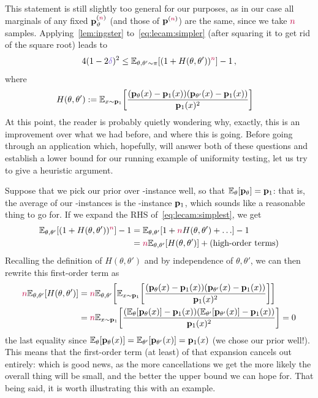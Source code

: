 This statement is still slightly too general for our purposes, as in our case all marginals of any fixed $\mathbf{p}_\vartheta^{({\textcolor{purple}{n}})}$ (and those of $\mathbf{p}^{({\textcolor{purple}{n}})}$) are the same, since we take ${\textcolor{purple}{n}}$ \iid samples. Applying~\cref{lem:ingster} to~\cref{eq:lecam:simpler} (after squaring it to get rid of the square root) leads to
\begin{equation}
	\label{eq:lecam:simplest}
	4(1-2\errprob)^2 \leq \bE{\theta,\theta'\sim\pi}{(1+{H(\theta,\theta')})^\ns} - 1\,,
\end{equation}
where 
\begin{align}
	\label{eq:lecam:simplest:chi:ip}
H(\theta,\theta') &\eqdef \bE{x\sim\p_\accept}{\frac{(\p_{\theta}(x)-\p_\accept(x))(\p_{\theta'}(x)-\p_\accept(x))}{\p_\accept(x)^2}}
\end{align}
At this point, the reader is probably quietly wondering why, exactly, this is an improvement over what we had before, and where this is going. Before going through an application which, hopefully, will answer both of these questions and establish a lower bound for our running example of uniformity testing, let us try to give a heuristic argument.

Suppose that we pick our prior over \no-instance well, so that $\bE{\theta}{\p_{\theta}}=\p_1$: that is, the average of our \no-instances is the \yes-instance $\mathbf{p}_1$, which sounds like a reasonable thing to go for. If we expand the RHS of~\cref{eq:lecam:simplest}, we get
\begin{align*}
\bE{\theta,\theta'}{(1+{H(\theta,\theta')})^\ns} - 1 
&=\bE{\theta,\theta'}{1+\ns H(\theta,\theta') + \dots } - 1 \\
&= \ns \bE{\theta,\theta'}{H(\theta,\theta')} + \textrm{(high-order terms)}
\end{align*}
Recalling the definition of $H(\theta,\theta')$ and by independence of $\theta,\theta'$, we can then rewrite this first-order term as
\begin{align*}
\ns \bE{\theta,\theta'}{H(\theta,\theta')}
&= \ns \bE{\theta,\theta'}{\bE{x\sim\p_\accept}{\frac{(\p_{\theta}(x)-\p_\accept(x))(\p_{\theta'}(x)-\p_\accept(x))}{\p_\accept(x)^2}}}\\
&=\ns \bE{x\sim\p_\accept}{\frac{(\bE{\theta}{\p_{\theta}(x)}-\p_\accept(x))(\bE{\theta'}{\p_{\theta'}(x)}-\p_\accept(x))}{\p_\accept(x)^2}}
= 0
\end{align*}
the last equality since $\bE{\theta}{\p_{\theta}(x)}=\bE{\theta'}{\p_{\theta'}(x)}=\p_\accept(x)$ (we chose our prior well!). This means that the first-order term (at least) of that expansion cancels out entirely: which is good news, as the more cancellations we get the more likely the overall thing will be small, and the better the upper bound we can hope for. That being said, it is worth illustrating this with an example.


